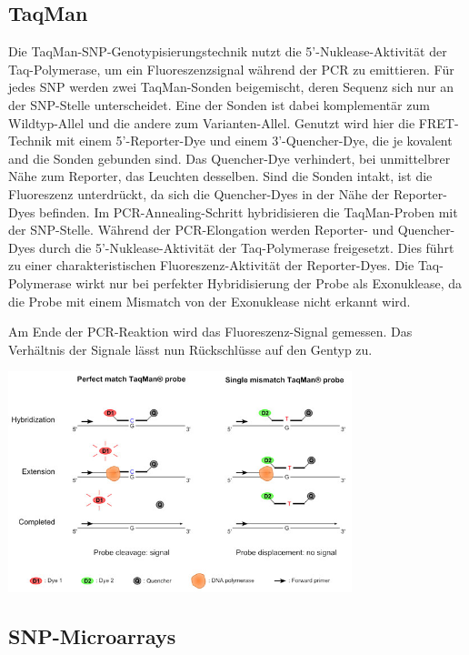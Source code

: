 \subsection{TaqMan}
Die TaqMan-SNP-Genotypisierungstechnik nutzt die 5'-Nuklease-Aktivität der Taq-Polymerase, um ein Fluoreszenzsignal während der PCR zu emittieren. Für jedes SNP werden zwei TaqMan-Sonden beigemischt, deren Sequenz sich nur an der SNP-Stelle unterscheidet. Eine der Sonden ist dabei komplementär zum Wildtyp-Allel und die andere zum Varianten-Allel. Genutzt wird hier die FRET-Technik mit einem 5'-Reporter-Dye und einem 3'-Quencher-Dye, die je kovalent and die Sonden gebunden sind. Das Quencher-Dye verhindert, bei unmittelbrer Nähe zum Reporter, das Leuchten desselben. Sind die Sonden intakt, ist die Fluoreszenz unterdrückt, da sich die Quencher-Dyes in der Nähe der Reporter-Dyes befinden. Im PCR-Annealing-Schritt hybridisieren die TaqMan-Proben mit der SNP-Stelle. Während der PCR-Elongation werden Reporter- und Quencher-Dyes durch die 5'-Nuklease-Aktivität der Taq-Polymerase freigesetzt. Dies führt zu einer charakteristischen Fluoreszenz-Aktivität der Reporter-Dyes. Die Taq-Polymerase wirkt nur bei perfekter Hybridisierung der Probe als Exonuklease, da die Probe mit einem Mismatch von der Exonuklease nicht erkannt wird.

Am Ende der PCR-Reaktion wird das Fluoreszenz-Signal gemessen. Das Verhältnis der Signale lässt nun Rückschlüsse auf den Gentyp zu.

\includegraphics[width=0.75\textwidth]{lectures/V2/pix/snpcalling1.png}

\subsection{SNP-Microarrays}

